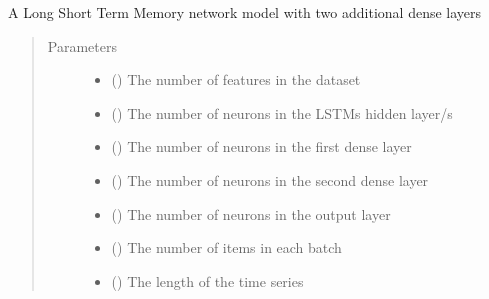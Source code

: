 \documentclass[letterpaper,10pt,english]{sphinxmanual}
\begin{document}

\begin{fulllineitems}
\label{\detokenize{models:Foresight.models.LSTM_deeper}}
A Long Short Term Memory network model with two additional dense layers
\begin{quote}\begin{description}
\item[{Parameters}] \leavevmode\begin{itemize}
\item {} 
 () \textendash{} The number of features in the dataset

\item {} 
 () \textendash{} The number of neurons in the LSTMs hidden layer/s

\item {} 
 () \textendash{} The number of neurons in the first dense layer

\item {} 
 () \textendash{} The number of neurons in the second dense layer

\item {} 
 () \textendash{} The number of neurons in the output layer

\item {} 
 () \textendash{} The number of items in each batch

\item {} 
 () \textendash{} The length of the time series


\end{itemize}
\end{description}
\end{quote}
\end{fulllineitems}
\end{document}
